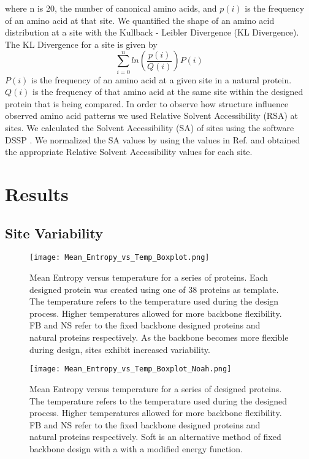 \documentclass[12pt]{article}
\begin{document}
where n is 20, the number of canonical amino acids, and $p(i)$ is the frequency of an amino acid at that site. 
We quantified the shape of an amino acid distribution at a site with the Kullback - Leibler Divergence (KL Divergence). 
The KL Divergence for a site is given by
	$$ \sum_{i=0}^nln  \left({\frac{p(i)}{Q(i)}}\right) P\left(i\right) $$
$P(i)$ is the frequency of an amino acid at a given site in a natural protein. $Q(i)$ is the frequency of that amino acid at the same site within the designed protein that is being compared.
In order to observe how structure influence observed amino acid patterns we used Relative Solvent Accessibility (RSA) at sites. We calculated the Solvent Accessibility (SA) of sites using the software DSSP \cite{Kabsch1983}. We normalized the SA values by using the values in Ref. \cite{Tien} and obtained the appropriate Relative Solvent Accessibility values for each site. 

\section{Results}
\label{Results}

\subsection{Site Variability}
\label{SiteVariability}
\begin{figure}[H]
\centerline{\texttt{[image: Mean\_Entropy\_vs\_Temp\_Boxplot.png]}}
\caption{Mean Entropy versus temperature for a series of proteins. Each designed protein was created using one of 38 proteins as template. The temperature refers to the temperature used during the design process. Higher temperatures allowed for more backbone flexibility. FB and NS refer to the fixed backbone designed proteins and natural proteins respectively.  As the backbone becomes more flexible during design, sites exhibit increased variability.}
\label{SiteVarFig1}
\end{figure}

\begin{figure}[H]
\centerline{\texttt{[image: Mean\_Entropy\_vs\_Temp\_Boxplot\_Noah.png]}}
\caption{Mean Entropy versus temperature for a series of designed proteins. The temperature refers to the temperature used during the designed process. Higher temperatures allowed for more backbone flexibility. FB and NS refer to the fixed backbone designed proteins and natural proteins respectively. Soft is an alternative method of fixed backbone design with a with a modified energy function.}
\label{NoahSiteVarFig1}
\end{figure}
\end{document}
